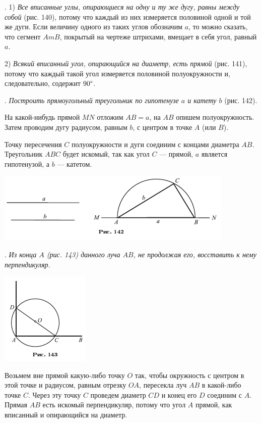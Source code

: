 \documentclass[oneside]{book}
\begin{document}
.
1) \emph{Все вписанные углы, опирающиеся на одну и ту же дугу, равны между собой} (рис. 140), потому что каждый из них измеряется половиной одной и той же дуги.
Если величину одного из таких углов обозначим $a$, то можно сказать, что сегмент $AmB$, покрытый на чертеже штрихами, вмещает в себя угол, равный $a$.

2) \emph{Всякий вписанный угол, опирающийся на диаметр, есть прямой} (рис. 141), потому что каждый такой угол измеряется половиной полуокружности и, следовательно, содержит $90\degree$.

.
\emph{Построить прямоугольный треугольник по гипотенузе $a$ и катету $b$} (рис. 142).

На какой-нибудь прямой $MN$ отложим $AB=a$, на $AB$ опишем полуокружность.
Затем проводим дугу радиусом, равным $b$, с центром в точке $A$ (или $B$).

Точку пересечения $C$ полуокружности и дуги соединим с концами диаметра $AB$.
Треугольник $ABC$ будет искомый, так как угол $C$ — прямой, $a$ является гипотенузой, а $b$ — катетом.

\includegraphics{pics/ris-142}

.
\emph{Из конца $A$ \emph{(рис. 143)} данного луча $AB$, не продолжая его, восставить к нему перпендикуляр.}

\includegraphics{pics/ris-143}

Возьмем вне прямой какую-либо точку $O$ так, чтобы окружность с центром в этой точке и радиусом, равным отрезку $OA$, пересекла луч $AB$ в какой-либо точке $C$.
Через эту точку $C$ проведем диаметр $CD$ и конец его $D$ соединим с $A$.
Прямая $AB$ есть искомый перпендикуляр, потому что угол $A$ прямой, как вписанный и опирающийся на диаметр.
\end{document}
